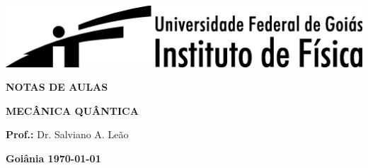 \documentclass[12pt,a4paper,twoside,twocolumn]{book} %
\begin{document}
\begin{titlepage}
\thispagestyle{empty}
\vspace*{-1.0cm}

\begin{center}
\includegraphics[width=0.90\linewidth]{Cab_IF_PB_01.eps}
\end{center}

\vspace*{3.0cm}
\begin{center}
\textbf{\LARGE NOTAS DE AULAS  }
\end{center}
\vspace{5.0cm}

\begin{center}
\textbf{\Huge MECÂNICA QUÂNTICA}
\end{center}
\vspace{\fill}

\begin{center}
{\LARGE \textbf{Prof.:} Dr. Salviano A. Le{\~{a}}o}
\vspace*{1.0cm}

{\Large \textbf{Goi\^{a}nia \today} }
\end{center}
\end{titlepage}

\pagestyle{empty}

\pagebreak
\newpage

\hfill
\newpage

\pagestyle{fancy}
\setcounter{page}{1}

\tableofcontents

\newpage

\setcounter{page}{1}







%

% 
% 
% 
% 
% 
% 
% 
% 
% 
% 


\end{document}
